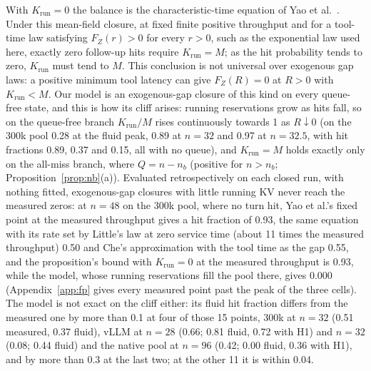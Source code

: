 \noindent With $K_{\mathrm{run}}=0$ the balance is the characteristic-time equation of Yao et al.~\citep{yao2026multiturn}. Under this mean-field closure, at fixed finite positive throughput and for a tool-time law satisfying $F_Z(r)>0$ for every $r>0$, such as the exponential law used here, exactly zero follow-up hits require $K_{\mathrm{run}}=M$; as the hit probability tends to zero, $K_{\mathrm{run}}$ must tend to $M$. This conclusion is not universal over exogenous gap laws: a positive minimum tool latency can give $F_Z(R)=0$ at $R>0$ with $K_{\mathrm{run}}<M$. Our model is an exogenous-gap closure of this kind on every queue-free state, and this is how its cliff arises: running reservations grow as hits fall, so on the queue-free branch $K_{\mathrm{run}}/M$ rises continuously towards 1 as $R\downarrow0$ (on the 300k pool 0.28 at the fluid peak, 0.89 at $n=32$ and 0.97 at $n=32.5$, with hit fractions 0.89, 0.37 and 0.15, all with no queue), and $K_{\mathrm{run}}=M$ holds exactly only on the all-miss branch, where $Q=n-n_b$ (positive for $n>n_b$; Proposition~\ref{prop:nb}(a)). Evaluated retrospectively on each closed run, with nothing fitted, exogenous-gap closures with little running KV never reach the measured zeros: at $n=48$ on the 300k pool, where no turn hit, Yao et al.'s fixed point at the measured throughput gives a hit fraction of 0.93, the same equation with its rate set by Little's law at zero service time (about 11 times the measured throughput) 0.50 and Che's approximation with the tool time as the gap 0.55, and the proposition's bound with $K_{\mathrm{run}}=0$ at the measured throughput is 0.93, while the model, whose running reservations fill the pool there, gives 0.000 (Appendix~\ref{app:fp} gives every measured point past the peak of the three cells). The model is not exact on the cliff either: its fluid hit fraction differs from the measured one by more than 0.1 at four of those 15 points, 300k at $n=32$ (0.51 measured, 0.37 fluid), vLLM at $n=28$ (0.66; 0.81 fluid, 0.72 with H1) and $n=32$ (0.08; 0.44 fluid) and the native pool at $n=96$ (0.42; 0.00 fluid, 0.36 with H1), and by more than 0.3 at the last two; at the other 11 it is within 0.04.

